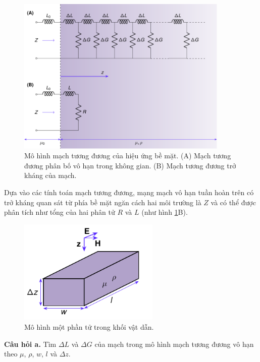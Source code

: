 \begin{figure}[!h]
    \centering
    \includegraphics[width=0.9\textwidth]{Problem_3/Figs_P3/Equivalent_circuit_skin_effect.pdf}
    \caption{Mô hình mạch tương đương của hiệu ứng bề mặt. (A) Mạch tương đương phân bố vô hạn trong không gian. (B) Mạch tương đương trở kháng của mạch.}
    \label{fig:Equivalent_circuit_skin_effect}
\end{figure}

Dựa vào các tính toán mạch tương đương, mạng mạch vô hạn tuần hoàn trên có trở kháng quan sát từ phía bề mặt ngăn cách hai môi trường là \(Z\) và có thể được phân tích như tổng của hai phân tử \(R\) và \(L\) (như hình \ref{fig:Equivalent_circuit_skin_effect}B).

\begin{figure}
    \centering
    \includegraphics[width=0.6\textwidth]{Problem_3/Figs_P3/Conductor.pdf}
    \caption{Mô hình một phần tử trong khối vật dẫn.}
    \label{fig:Conductor}
\end{figure}

\textbf{Câu hỏi a.} Tìm \( \Delta L \) và \( \Delta G \) của mạch trong mô hình mạch tương đương vô hạn theo \(\mu\), \(\rho\), \(w\), \(l\) và \( \Delta z \).


